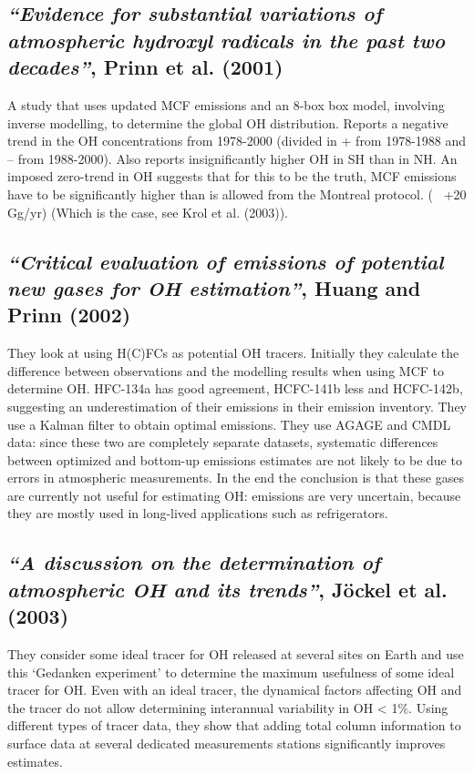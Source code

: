 \documentclass{article}
\begin{document}
\subsection{\textit{“Evidence for substantial variations of atmospheric hydroxyl radicals in the past two decades”}, Prinn et al. (2001)}
A study that uses updated MCF emissions and an 8-box box model, involving inverse modelling, to determine the global OH distribution. Reports a negative trend in the OH concentrations from 1978-2000 (divided in + from 1978-1988 and – from 1988-2000). Also reports insignificantly higher OH in SH than in NH. An imposed zero-trend in OH suggests that for this to be the truth, MCF emissions have to be significantly higher than is allowed from the Montreal protocol. (~ +20 Gg/yr) (Which is the case, see Krol et al. (2003)).

\subsection{\textit{“Critical evaluation of emissions of potential new gases for OH estimation”}, Huang and Prinn (2002)}
They look at using H(C)FCs as potential OH tracers. Initially they calculate the difference between observations and the modelling results when using MCF to determine OH. HFC-134a has good agreement, HCFC-141b less and HCFC-142b, suggesting an underestimation of their emissions in their emission inventory. They use a Kalman filter to obtain optimal emissions. They use AGAGE and CMDL data: since these two are completely separate datasets, systematic differences between optimized and bottom-up emissions estimates are not likely to be due to errors in atmospheric measurements. In the end the conclusion is that these gases are currently not useful for estimating OH: emissions are very uncertain, because they are mostly used in long-lived applications such as refrigerators.

\subsection{\textit{“A discussion on the determination of atmospheric OH and its trends”}, Jöckel et al. (2003)}
They consider some ideal tracer for OH released at several sites on Earth and use this ‘Gedanken experiment’ to determine the maximum usefulness of some ideal tracer for OH. Even with an ideal tracer, the dynamical factors affecting OH and the tracer do not allow determining interannual variability in OH < 1$\%$. Using different types of tracer data, they show that adding total column information to surface data at several dedicated measurements stations significantly improves estimates.
\end{document}
